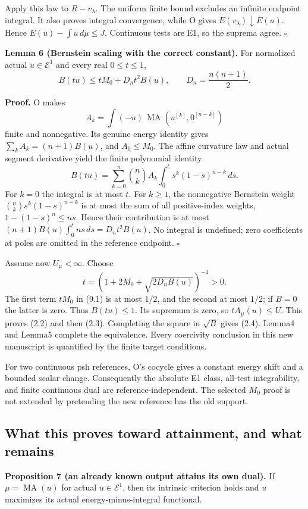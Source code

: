\documentclass[
  11pt,
]{article}
\begin{document}
Apply this law to \(R-v_\lambda\). The uniform finite bound excludes an
infinite endpoint integral. It also proves integral convergence, while O
gives \(E(v_\lambda)\downarrow E(u)\). Hence
\(E(u)-\int u\,d\mu\leq J\). Continuous tests are E1, so the suprema
agree. \(\square\)

\textbf{Lemma 6 (Bernstein scaling with the correct constant).} For
normalized actual \(u\in\mathcal E^1\) and every real \(0\leq t\leq1\),
\[
 B(tu)\leq tM_0+D_nt^2B(u),\qquad D_n=\frac{n(n+1)}2. \tag{9.1}
\]

\textbf{Proof.} O makes \[
 A_k=\int(-u)\,\operatorname{MA}(u^{[k]},0^{[n-k]})
\] finite and nonnegative. Its genuine energy identity gives
\(\sum_kA_k=(n+1)B(u)\), and \(A_0\leq M_0\). The affine curvature law
and actual segment derivative yield the finite polynomial identity \[
 B(tu)=\sum_{k=0}^n\binom nk A_k
          \int_0^t s^k(1-s)^{n-k}\,ds. \tag{9.2}
\] For \(k=0\) the integral is at most \(t\). For \(k\geq1\), the
nonnegative Bernstein weight \(\binom nk s^k(1-s)^{n-k}\) is at most the
sum of all positive-index weights, \(1-(1-s)^n\leq ns\). Hence their
contribution is at most \((n+1)B(u)\int_0^t ns\,ds=D_nt^2B(u)\). No
integral is undefined; zero coefficients at poles are omitted in the
reference endpoint. \(\square\)

Assume now \textbf{\(U_\mu<\infty\)}. Choose \[
 t=(1+2M_0+\sqrt{2D_nB(u)})^{-1}>0.
\] The first term \(tM_0\) in (9.1) is at most \(1/2\), and the second
at most \(1/2\); if \(B=0\) the latter is zero. Thus \(B(tu)\leq1\). Its
supremum is zero, so \(tA_\mu(u)\leq U\). This proves (2.2) and then
(2.3). Completing the square in \(\sqrt B\) gives (2.4). Lemma4 and
Lemma5 complete the equivalence. Every coercivity conclusion in this new
manuscript is quantified by the finite target conditions.

For two continuous psh references, O's cocycle gives a constant energy
shift and a bounded scalar change. Consequently the absolute E1 class,
all-test integrability, and finite continuous dual are
reference-independent. The selected \(M_0\) proof is not extended by
pretending the new reference has the old support.

\subsection{What this proves toward attainment, and what
remains}\label{what-this-proves-toward-attainment-and-what-remains}

\textbf{Proposition 7 (an already known output attains its own dual).}
If \(\mu=\operatorname{MA}(u)\) for actual \(u\in\mathcal E^1\), then
its intrinsic criterion holds and \(u\) maximizes its actual
energy-minus-integral functional.
\end{document}
